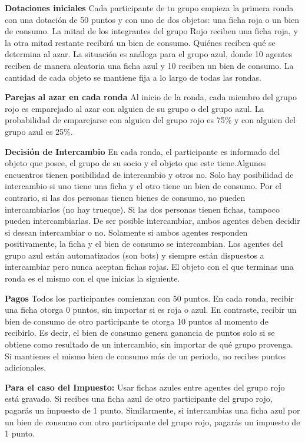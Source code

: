 {{\textbf{    Dotaciones iniciales}
Cada participante de tu grupo empieza la primera ronda con una dotación de 50 puntos y con uno de dos objetos: una ficha roja o un bien de consumo. La mitad de los integrantes del grupo Rojo reciben una ficha roja, y la otra mitad restante recibirá un bien de consumo. Quiénes reciben qué se determina al azar. La situación es análoga para el grupo azul, donde 10 agentes reciben de manera aleatoria una ficha azul y 10 reciben un bien de consumo.  La cantidad de cada objeto se mantiene fija a lo largo de todas las rondas.
    
    \textbf{Parejas al azar en cada ronda}
    Al inicio de la ronda, cada miembro del grupo rojo es emparejado al azar con alguien de su grupo o del grupo azul. La probabilidad de emparejarse con alguien del grupo rojo es 75\% y con alguien del grupo azul es 25\%.
    
    \textbf{Decisión de Intercambio}
    En cada ronda, el participante es informado del objeto que posee, el grupo de su socio y el objeto que este tiene.Algunos encuentros tienen posibilidad de intercambio y otros no. Solo hay posibilidad de intercambio si uno tiene una ficha y el otro tiene un bien de consumo. Por el contrario, si las dos personas tienen bienes de consumo, no pueden intercambiarlos (no hay trueque). Si las dos personas tienen fichas, tampoco pueden intercambiarlas. De ser posible intercambiar, ambos agentes deben decidir si desean intercambiar o no. Solamente si ambos agentes responden positivamente, la ficha y el bien de consumo se intercambian. Los agentes del grupo azul están automatizados (son bots) y siempre están dispuestos a intercambiar pero nunca aceptan fichas rojas.  El objeto con el que terminas una ronda es el mismo con el que inicias la siguiente.
    

    \textbf{Pagos}
        Todos los participantes comienzan con 50 puntos.
        En cada ronda, recibir una ficha otorga 0 puntos, sin importar si es roja o azul.
        En contraste, recibir un bien de consumo de otro participante te otorga 10 puntos al momento de recibirlo.
        Es decir, el bien de consumo genera ganancia de puntos solo si se obtiene como resultado de un intercambio, sin importar de qué grupo provenga.
        Si mantienes el mismo bien de consumo más de un periodo, no recibes puntos adicionales.
        
        
           \textbf{ Para el caso del Impuesto: }
            Usar fichas azules entre agentes del grupo rojo está gravado.
            Si recibes una ficha azul de otro participante del grupo rojo, pagarás un impuesto de 1 punto.
            Similarmente, si intercambias una ficha azul por un bien de consumo con otro participante del grupo rojo, pagarás un impuesto de 1 punto.
        
}}

